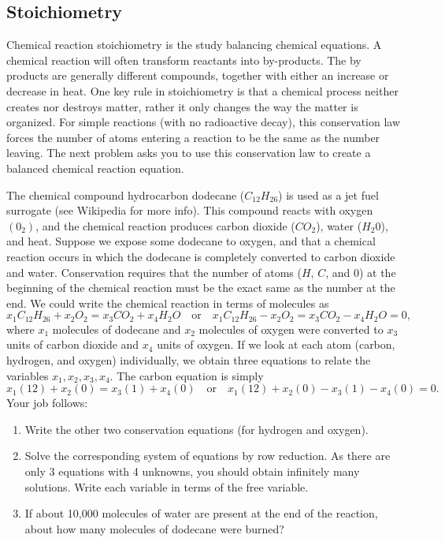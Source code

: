 \subsection{Stoichiometry}
Chemical reaction stoichiometry is the study balancing chemical equations. A chemical reaction will often transform reactants into by-products. The by products are generally different compounds, together with either an increase or decrease in heat. One key rule in stoichiometry is that a chemical process neither creates nor destroys matter, rather it only changes the way the matter is organized. For simple reactions (with no radioactive decay), this conservation law forces the number of atoms entering a reaction to be the same as the number leaving. The next problem asks you to use this conservation law to create a balanced chemical reaction equation. 
\begin{problem}
 The chemical compound hydrocarbon dodecane ($C_{12}H_{26}$) is used as a jet fuel surrogate (see Wikipedia for more info).  This compound reacts with oxygen $(0_2)$, and the chemical reaction produces carbon dioxide ($CO_2$), water ($H_2 0$), and heat.  Suppose we expose some dodecane to oxygen, and that a chemical reaction occurs in which the dodecane is completely converted to carbon dioxide and water.  
 Conservation requires that the number of atoms ($H$, $C$, and $0$) at the beginning of the chemical reaction must be the exact same as the number at the end. 
 We could write the chemical reaction in terms of molecules as
 $$x_1 C_{12}H_{26} +x_2 O_2 = x_3 CO_2+ x_4 H_2O\quad \text{or} \quad x_1 C_{12}H_{26} -x_2 O_2 = x_3 CO_2- x_4 H_2O=0, $$
 where $x_1$ molecules of dodecane and $x_2$ molecules of oxygen were converted to $x_3$ units of carbon dioxide and $x_4$ units of oxygen.  
 If we look at each atom (carbon, hydrogen, and oxygen) individually, we obtain three equations to relate the variables $x_1, x_2, x_3, x_4$.  The carbon equation is simply
 $$x_1(12) + x_2(0) = x_3(1)+x_4(0) \quad \text{or}\quad x_1(12) + x_2(0) - x_3(1)-x_4(0)=0.$$  
 Your job follows:
\begin{enumerate}
 \item Write the other two conservation equations (for hydrogen and oxygen). 
 \item Solve the corresponding system of equations by row reduction.  As there are only 3 equations with 4 unknowns, you should obtain infinitely many solutions. Write each variable in terms of the free variable.  
 \item If about 10,000 molecules of water are present at the end of the reaction, about how many molecules of dodecane were burned? 
\end{enumerate}
\end{problem}


